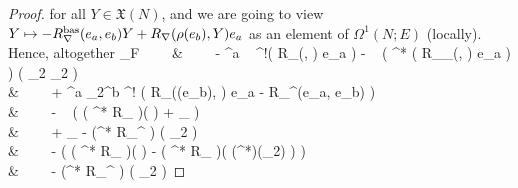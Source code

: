\begin{proof}
\eas
for all $Y\in \mathfrak{X}(N)$, and we are going to view $Y \mapsto - R_\nabla^{\mathrm{bas}}(e_a, e_b) Y + R_\nabla \mleft( \rho(e_b), Y \mright) e_a$ as an element of $\Omega^1(N; E)$ (locally). Hence, altogether
\bas
\delta_\varepsilon F
~~~~&~~~~
- \varepsilon^a ~ {}^!\bigl( R_{\nabla}(\cdot, \cdot) e_a \bigr)
	- ~
	\mleft( {}^* \mleft( R_{\nabla_\rho}(\cdot, \cdot) e_a \mright) \mright) \mleft( \varpi_2 \stackrel{\wedge}{,} \varpi_2 \mright)
\\
&\hspace{1cm}~~~~
	+ \varepsilon^a \varpi_2^b \wedge {}^! \mleft( R_\nabla(\rho(e_b), \cdot) e_a - R_\nabla^{}(e_a, e_b) \mright)
\\
&~~~~
- ~ \Bigl(
 \mleft(	{}^* R_{\nabla} \mright)\mleft( \stackrel{\wedge}{,} \mright) \varepsilon
	+ 
	_{}
	\Bigr)
\\
&\hspace{1cm}~~~~
	+ 
	_{}
	- \mleft({}^* R_\nabla^{} \mright) \mleft(\varepsilon \stackrel{\wedge}{,} \varpi_2  \stackrel{\wedge}{,} \mright)
\\
&~~~~
- \Bigl(
	 \mleft(	{}^* R_{\nabla} \mright)\mleft(  \stackrel{\wedge}{,} \mright) \varepsilon
	- \mleft( {}^* R_{\nabla} \mright)\mleft(  \stackrel{\wedge}{,} \mleft({}^*\rho\mright)(\varpi_2) \mright) \varepsilon
\Bigr)
\\
&\hspace{1cm}~~~~
	- \mleft({}^* R_\nabla^{} \mright) \mleft(\varepsilon \stackrel{\wedge}{,} \varpi_2  \stackrel{\wedge}{,} \mright)

\end{proof}
